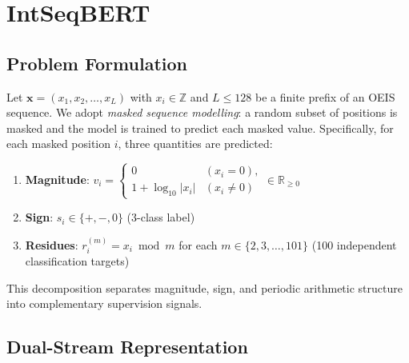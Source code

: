 
\section{IntSeqBERT}
\label{sec:model}

\subsection{Problem Formulation}
\label{sec:formulation}

Let $\mathbf{x} = (x_1, x_2, \ldots, x_L)$ with $x_i \in \mathbb{Z}$ and $L \leq 128$ be a
finite prefix of an OEIS sequence. We adopt \emph{masked sequence modelling}: a random subset
of positions is masked and the model is trained to predict each masked value. Specifically, for
each masked position $i$, three quantities are predicted:
\begin{enumerate}
  \item \textbf{Magnitude}: $v_i =
    \begin{cases} 0 & (x_i = 0),\\ 1 + \log_{10}|x_i| & (x_i \neq 0) \end{cases} \in \mathbb{R}_{\geq 0}$
  \item \textbf{Sign}: $s_i \in \{+, -, 0\}$ (3-class label)
  \item \textbf{Residues}: $r_i^{(m)} = x_i \bmod m$ for each $m \in \{2, 3, \ldots, 101\}$
        (100 independent classification targets)
\end{enumerate}
This decomposition separates magnitude, sign, and periodic arithmetic structure into
complementary supervision signals.

\subsection{Dual-Stream Representation}
\label{sec:dualstream}

